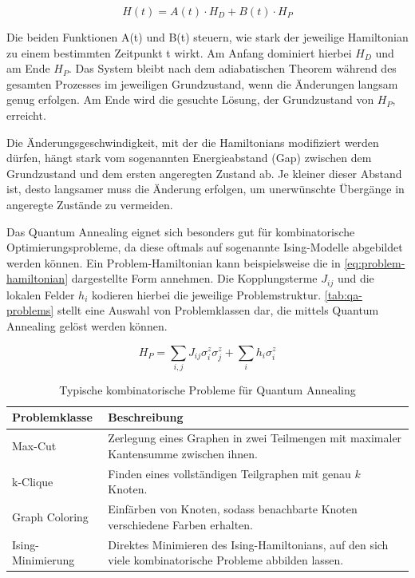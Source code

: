 \begin{equation}
    H(t) = A(t) \cdot H_D + B(t) \cdot H_P
\label{eq:time-dependent-hamiltonian}
\end{equation}

Die beiden Funktionen A(t) und B(t) steuern, wie stark der jeweilige Hamiltonian zu einem bestimmten Zeitpunkt t wirkt. Am Anfang dominiert hierbei $H_D$ und am Ende $H_P$. Das System bleibt nach dem adiabatischen Theorem während des gesamten Prozesses im jeweiligen Grundzustand, wenn die Änderungen langsam genug erfolgen. Am Ende wird die gesuchte Lösung, der Grundzustand von $H_P$, erreicht.
 
Die Änderungsgeschwindigkeit, mit der die Hamiltonians modifiziert werden dürfen, hängt stark vom sogenannten Energieabstand (Gap) zwischen dem Grundzustand und dem ersten angeregten Zustand ab. Je kleiner dieser Abstand ist, desto langsamer muss die Änderung erfolgen, um unerwünschte Übergänge in angeregte Zustände zu vermeiden.

Das Quantum Annealing eignet sich besonders gut für kombinatorische Optimierungsprobleme, da diese oftmals auf sogenannte Ising-Modelle abgebildet werden können. Ein Problem-Hamiltonian kann beispielsweise die in \autoref{eq:problem-hamiltonian} dargestellte Form annehmen. Die Kopplungsterme $J_{ij}$ und die lokalen Felder $h_i$ kodieren hierbei die jeweilige Problemstruktur. \autoref{tab:qa-problems} stellt eine Auswahl von Problemklassen dar, die mittels Quantum Annealing gelöst werden können.

\begin{equation}
H_P = \sum_{i,j} J_{ij}\sigma_i^z\sigma_j^z + \sum_i h_i\sigma_i^z
\label{eq:problem-hamiltonian}
\end{equation}

\begin{table}[ht!]
\centering
\begin{tabularx}{\textwidth}{|l|X|}
\hline
\textbf{Problemklasse} & \textbf{Beschreibung} \\
\hline
Max-Cut & Zerlegung eines Graphen in zwei Teilmengen mit maximaler Kantensumme zwischen ihnen. \\
\hline
k-Clique & Finden eines vollständigen Teilgraphen mit genau \(k\) Knoten. \\
\hline
Graph Coloring & Einfärben von Knoten, sodass benachbarte Knoten verschiedene Farben erhalten. \\
\hline
Ising-Minimierung & Direktes Minimieren des Ising-Hamiltonians, auf den sich viele kombinatorische Probleme abbilden lassen. \\
\hline
\end{tabularx}
\caption{Typische kombinatorische Probleme für Quantum Annealing}
\label{tab:qa-problems}
\end{table}

